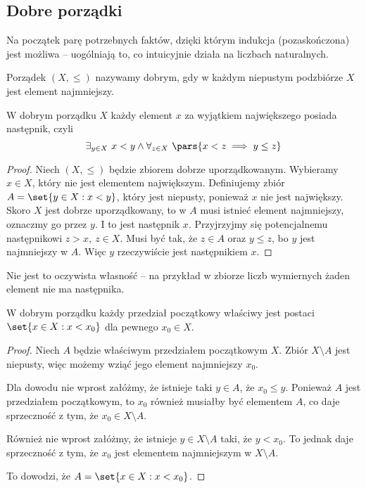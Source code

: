 \subsection{Dobre porządki}
Na początek parę potrzebnych faktów, dzięki którym indukcja (pozaskończona) jest możliwa -- uogólniają to, co intuicyjnie działa na liczbach naturalnych.

\begin{definition}
    Porządek \( (X, \leq) \) nazywamy dobrym, gdy w każdym niepustym podzbiórze \( X \) jest element najmniejszy.
\end{definition}

\begin{theorem}
    W dobrym porządku \( X \) każdy element \( x \) za wyjątkiem największego posiada następnik, czyli
    \[
        \exists_{y \in X} \ x < y \land \forall_{z \in X} \ \pars{x < z \implies y \leq z}
    \]
\end{theorem}
\begin{proof}
    Niech \( (X, \leq) \) będzie zbiorem dobrze uporządkowanym. Wybieramy \( x \in X \), który nie jest elementem największym.
    Definiujemy zbiór \( A = \set{y \in X : x < y} \), który jest niepusty, ponieważ \( x \) nie jest największy. Skoro \( X \) jest dobrze uporządkowany, to w \( A \) musi istnieć element najmniejszy, oznaczmy go przez \( y \).
    I to jest następnik \( x \). Przyjrzyjmy się potencjalnemu następnikowi \( z > x, \ z \in X \). Musi być tak, że \( z \in A \) oraz \( y \leq z \), bo \( y \) jest najmniejszy w \( A \).
    Więc \( y \) rzeczywiście jest następnikiem \( x \).
\end{proof}
Nie jest to oczywista własność -- na przykład w zbiorze liczb wymiernych żaden element nie ma następnika.

\begin{theorem}
    W dobrym porządku każdy przedział początkowy właściwy jest postaci \( \set{x \in X : x < x_0} \) dla pewnego \( x_0 \in X \).
\end{theorem}
\begin{proof}
    Niech \( A \) będzie właściwym przedziałem początkowym \( X \). Zbiór \( X \setminus A \) jest niepusty, więc możemy wziąć jego element najmniejszy \( x_0 \).

    Dla dowodu nie wprost załóżmy, że istnieje taki \( y \in A \), że \( x_0 \leq y \). Ponieważ \( A \) jest przedziałem początkowym, to \( x_0 \) również musiałby być elementem \( A \), co daje sprzeczność z tym, że \( x_0 \in X \setminus A \).

    Również nie wprost załóżmy, że istnieje \( y \in X \setminus A \) taki, że \( y < x_0 \). To jednak daje sprzeczność z tym, że \( x_0 \) jest elementem najmniejszym w \( X \setminus A \).

    To dowodzi, że \( A = \set{x \in X : x < x_0} \).
\end{proof}
